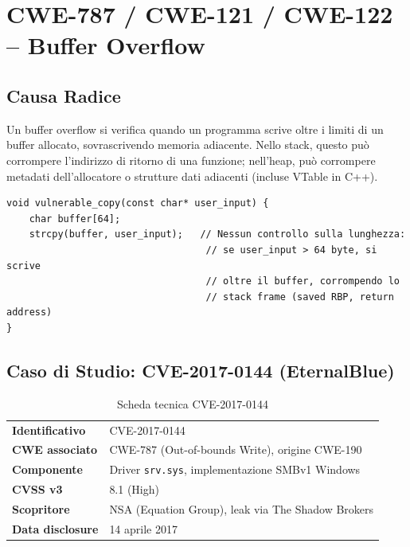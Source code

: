 \documentclass[11pt,a4paper]{article}
\begin{document}
\section{CWE-787 / CWE-121 / CWE-122 -- Buffer Overflow}

\subsection{Causa Radice}

Un buffer overflow si verifica quando un programma scrive oltre i limiti di un buffer allocato, sovrascrivendo memoria adiacente. Nello stack, questo può corrompere l'indirizzo di ritorno di una funzione; nell'heap, può corrompere metadati dell'allocatore o strutture dati adiacenti (incluse VTable in C++).

\begin{lstlisting}[caption={Pattern vulnerabile tipico (CWE-121, stack buffer overflow)}]
void vulnerable_copy(const char* user_input) {
    char buffer[64];
    strcpy(buffer, user_input);   // Nessun controllo sulla lunghezza:
                                   // se user_input > 64 byte, si scrive
                                   // oltre il buffer, corrompendo lo
                                   // stack frame (saved RBP, return address)
}
\end{lstlisting}

\subsection{Caso di Studio: CVE-2017-0144 (EternalBlue)}

\begin{table}[h]
\centering
\begin{tabular}{@{}ll@{}}
\toprule
\textbf{Identificativo} & CVE-2017-0144 \\
\textbf{CWE associato} & CWE-787 (Out-of-bounds Write), origine CWE-190 \\
\textbf{Componente} & Driver \texttt{srv.sys}, implementazione SMBv1 Windows \\
\textbf{CVSS v3} & 8.1 (High) \\
\textbf{Scopritore} & NSA (Equation Group), leak via The Shadow Brokers \\
\textbf{Data disclosure} & 14 aprile 2017 \\
\bottomrule
\end{tabular}
\caption{Scheda tecnica CVE-2017-0144}
\end{table}
\end{document}
